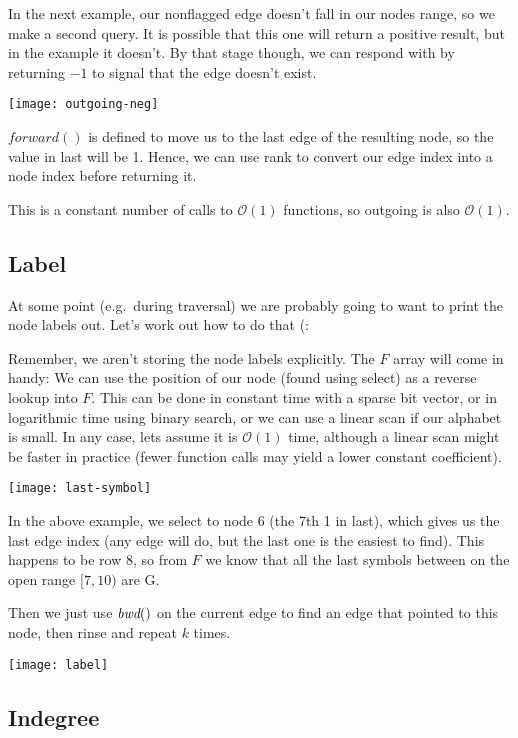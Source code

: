 In the next example, our nonflagged edge doesn't fall in our nodes range, so we make a second query. It is possible that this one will return a positive result, but in the example it doesn't. By that stage though, we can respond with by returning $-1$ to signal that the edge doesn't exist.

\medskip\centerline{\texttt{[image: outgoing-neg]}}\medskip

$\textit{forward}()$ is defined to move us to the last edge of the resulting node, so the value in last will be 1. Hence, we can use rank to convert our edge index into a node index before returning it.

This is a constant number of calls to $\mathcal{O}(1)$ functions, so outgoing is also $\mathcal{O}(1)$.

\subsection{Label}\label{bl-sec:lab}

At some point (e.g.\ during traversal) we are probably going to want to print the node labels out. Let's work out how to do that (:

Remember, we aren't storing the node labels explicitly. The $F$ array will come in handy: We can use the position of our node (found using select) as a reverse lookup into $F$. This can be done in constant time with a sparse bit vector, or in logarithmic time using binary search, or we can use a linear scan if our alphabet is small. In any case, lets assume it is $\mathcal{O}(1)$ time, although a linear scan might be faster in practice (fewer function calls may yield a lower constant coefficient).

\medskip\centerline{\texttt{[image: last-symbol]}}\medskip

In the above example, we select to node 6 (the 7th 1 in last), which gives us the last edge index (any edge will do, but the last one is the easiest to find). This happens to be row 8, so from $F$ we know that all the last symbols between on the open range $[7,10)$ are G.

Then we just use $\textit{bwd}()$ on the current edge to find an edge that pointed to this node, then rinse and repeat $k$ times.

\medskip\centerline{\texttt{[image: label]}}\medskip

\subsection{Indegree}\label{bl-sec:ind}

